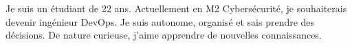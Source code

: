
\begin{cvparagraph}
Je suis un étudiant de 22 ans. Actuellement en M2 Cybersécurité, je souhaiterais devenir ingénieur DevOps. Je suis autonome, organisé et sais prendre des décisions. De nature curieuse, j'aime apprendre de nouvelles connaissances.
\end{cvparagraph}
